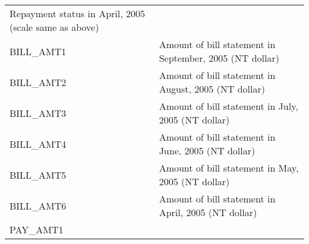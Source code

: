 \documentclass[]{article}
\begin{document}
\begin{longtable}[]{@{}ll@{}}
\begin{minipage}[t]{0.70\columnwidth}
Repayment status in April, 2005 (scale same as above)\strut
\end{minipage}\tabularnewline
\begin{minipage}[t]{0.24\columnwidth}\raggedright\strut
BILL\_AMT1\strut
\end{minipage} & \begin{minipage}[t]{0.70\columnwidth}\raggedright\strut
Amount of bill statement in September, 2005 (NT dollar)\strut
\end{minipage}\tabularnewline
\begin{minipage}[t]{0.24\columnwidth}\raggedright\strut
BILL\_AMT2\strut
\end{minipage} & \begin{minipage}[t]{0.70\columnwidth}\raggedright\strut
Amount of bill statement in August, 2005 (NT dollar)\strut
\end{minipage}\tabularnewline
\begin{minipage}[t]{0.24\columnwidth}\raggedright\strut
BILL\_AMT3\strut
\end{minipage} & \begin{minipage}[t]{0.70\columnwidth}\raggedright\strut
Amount of bill statement in July, 2005 (NT dollar)\strut
\end{minipage}\tabularnewline
\begin{minipage}[t]{0.24\columnwidth}\raggedright\strut
BILL\_AMT4\strut
\end{minipage} & \begin{minipage}[t]{0.70\columnwidth}\raggedright\strut
Amount of bill statement in June, 2005 (NT dollar)\strut
\end{minipage}\tabularnewline
\begin{minipage}[t]{0.24\columnwidth}\raggedright\strut
BILL\_AMT5\strut
\end{minipage} & \begin{minipage}[t]{0.70\columnwidth}\raggedright\strut
Amount of bill statement in May, 2005 (NT dollar)\strut
\end{minipage}\tabularnewline
\begin{minipage}[t]{0.24\columnwidth}\raggedright\strut
BILL\_AMT6\strut
\end{minipage} & \begin{minipage}[t]{0.70\columnwidth}\raggedright\strut
Amount of bill statement in April, 2005 (NT dollar)\strut
\end{minipage}\tabularnewline
\begin{minipage}[t]{0.24\columnwidth}\raggedright\strut
PAY\_AMT1\strut

\end{minipage}
\end{longtable}
\end{document}
